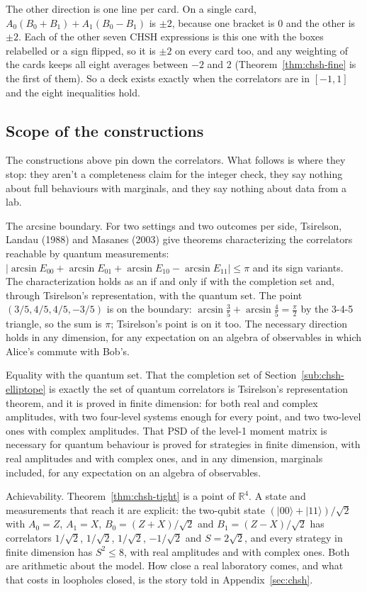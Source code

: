 \documentclass[11pt,twoside]{article}
\theoremstyle{thielethm}
\theoremstyle{thieledef}
\theoremstyle{thieledef}
\theoremstyle{thieledef}
\theoremstyle{thielethm}
\theoremstyle{thieleobs}
\theoremstyle{thielethm}
\begin{document}
The other direction is one line per card. On a single card,
$A_0(B_0+B_1)+A_1(B_0-B_1)$ is $\pm2$, because one bracket is 0 and the other is $\pm2$.
Each of the other seven CHSH expressions is this one with the boxes relabelled or a sign
flipped, so it is $\pm2$ on every card too, and any weighting of the cards keeps all eight
averages between $-2$ and 2 (Theorem~\ref{thm:chsh-fine} is the first of them). So a
deck exists exactly when the correlators are in $[-1,1]$ and the eight inequalities hold.

\subsection{Scope of the constructions}


The constructions above pin down the correlators. What follows is where they stop: they
aren't a completeness claim for the integer check, they say nothing about full behaviours
with marginals, and they say nothing about data from a lab.

The arcsine boundary. For two settings and two outcomes per side, Tsirelson, Landau (1988) and
Masanes (2003) give theorems characterizing the correlators reachable by quantum measurements:
$|\arcsin E_{00} + \arcsin E_{01} + \arcsin E_{10} - \arcsin E_{11}| \le \pi$ and its sign
variants. The characterization holds as an if and only if with the
completion set and, through Tsirelson's representation, with the quantum
set. The point $(3/5, 4/5, 4/5, -3/5)$ is on the boundary:
$\arcsin \tfrac35 + \arcsin \tfrac45 = \tfrac{\pi}{2}$ by the 3-4-5 triangle, so the sum is $\pi$; Tsirelson's point is on it too.
The necessary direction holds in any dimension, for any expectation on an algebra of
observables in which Alice's commute with Bob's.

Equality with the quantum set. That the completion set of Section~\ref{sub:chsh-elliptope} is exactly the set of
quantum correlators is Tsirelson's representation theorem, and it is proved in finite dimension:
for both real and complex amplitudes, with two four-level systems enough for every point, and two
two-level ones with complex amplitudes. That PSD of the level-1 moment matrix is necessary for
quantum behaviour is proved for strategies in finite dimension, with real amplitudes
and with complex ones, and in any dimension, marginals included, for any expectation on
an algebra of observables.

Achievability. Theorem~\ref{thm:chsh-tight} is a point of $\mathbb{R}^4$. A state and
measurements that reach it are explicit: the two-qubit state
$(|00\rangle + |11\rangle)/\sqrt 2$ with $A_0 = Z$, $A_1 = X$, $B_0 = (Z + X)/\sqrt 2$ and
$B_1 = (Z - X)/\sqrt 2$ has correlators $1/\sqrt 2$, $1/\sqrt 2$, $1/\sqrt 2$, $-1/\sqrt 2$ and
$S = 2\sqrt 2$, and every strategy in finite dimension has
$S^2 \le 8$, with real amplitudes and with complex ones. Both are arithmetic about the model.
How close a real laboratory comes, and what that costs in loopholes closed, is the story told in
Appendix~\ref{sec:chsh}.
\end{document}

